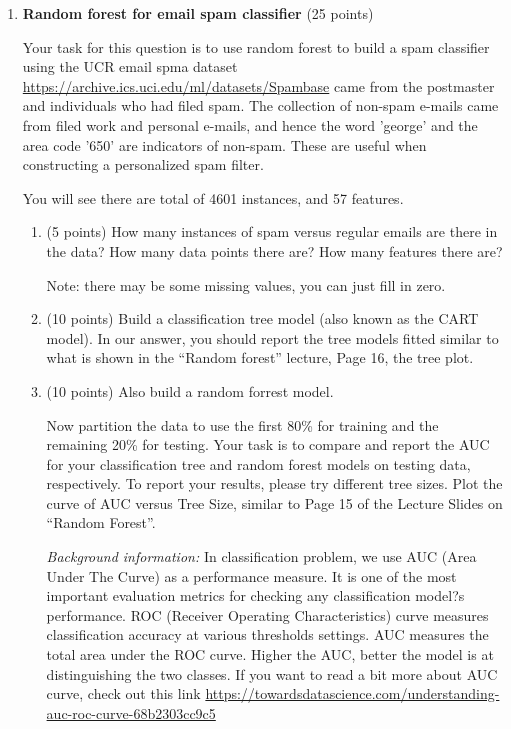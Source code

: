\documentclass[twoside,12pt]{article}
\begin{document}
\begin{enumerate}
\clearpage

\item{\bf Random forest for email spam classifier} (25 points)

Your task for this question is to use random forest to build a spam classifier using the UCR email spma dataset \url{https://archive.ics.uci.edu/ml/datasets/Spambase} came from the postmaster and individuals who had filed spam. The collection of non-spam e-mails came from filed work and personal e-mails, and hence the word \textsf{'george'} and the area code \textsf{'650'} are indicators of non-spam. These are useful when constructing a personalized spam filter. 

You will see there are total of 4601 instances, and 57 features. 

\begin{enumerate}

\item (5 points) How many instances of spam versus regular emails are there in the data? How many data points there are? How many features there are?

Note: there may be some missing values, you can just fill in zero.

\item (10 points) Build a classification tree model (also known as the CART model). In our answer, you should report the tree models fitted similar to what is shown in the ``Random forest'' lecture, Page 16, the tree plot.

\item (10 points)
Also build a random forrest model. 

Now partition the data to use the first 80\% for training and the remaining 20\% for testing. Your task is to compare and report the AUC  for your classification tree and random forest models on testing data, respectively. To report your results, please try different tree sizes. Plot the curve of AUC versus Tree Size, similar to Page 15 of the Lecture Slides on ``Random Forest''. 


{\it Background information:} In classification problem, we use AUC (Area Under The Curve) as a performance measure. It is one of the most important evaluation metrics for checking any classification model?s performance. ROC (Receiver Operating Characteristics) curve measures classification accuracy at various thresholds settings. AUC measures the total area under the ROC curve. Higher the AUC, better the model is at distinguishing the two classes. If you want to read a bit more about AUC curve, check out this link \url{https://towardsdatascience.com/understanding-auc-roc-curve-68b2303cc9c5} 
\end{enumerate}


\end{enumerate}
\end{document}
